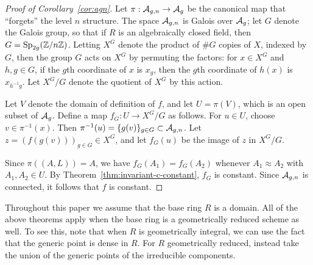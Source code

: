 \documentclass{amsart}
\begin{document}
\begin{proof}[Proof of Corollary~\ref{cor:agn}]
  Let $\pi: \mathcal{A}_{g,n} \to \mathcal{A}_g$ be the canonical map that ``forgets'' the level $n$ structure. The space $\mathcal{A}_{g,n}$ is Galois over $\mathcal{A}_g$; let $G$ denote the Galois group, so that if $R$ is an algebraically closed field, then $G = \operatorname{Sp}_{2g}(\mathbb{Z}/n\mathbb{Z})$. Letting $X^G$ denote the product of $\# G$ copies of $X$, indexed by $G$, then the group $G$ acts on $X^G$ by permuting the factors: for $x \in X^G$ and $h,g \in G$, if the $g$th coordinate of $x$ is $x_g$, then the $g$th coordinate of $h(x)$ is $x_{h^{-1}g}$.
  Let $X^G/G$ denote the quotient of $X^G$ by this action.

  Let $V$ denote the domain of definition of $f$, and let $U = \pi(V)$, which is an open subset of $\mathcal{A}_g$. Define a map $f_G: U \to X^G/G$ as follows. For $u \in U$, choose  $v \in \pi^{-1}(x)$. Then $\pi^{-1}(u) = \{g(v)\}_{g \in G} \subset \mathcal{A}_{g,n}$. Let $z = (f(g(v)))_{g \in G} \in X^G$, and let $f_G(u)$ be the image of $z$ in $X^G/G$.

  Since $\pi((A,L)) = A$, we have $f_G(A_1) = f_G(A_2)$ whenever $A_1 \approx A_2$ with $A_1,A_2 \in U$. By Theorem~\ref{thm:invariant-c-constant}, $f_G$ is constant. Since $\mathcal{A}_{g,n}$ is connected, it follows that $f$ is constant.
\end{proof}

\begin{remark}
Throughout this paper we assume that the base ring $R$ is a domain.
  All of the above theorems apply when the base ring is a geometrically reduced scheme as well. To see this, note that when $R$ is geometrically integral, we can use the fact that the generic point is dense in $R$. For $R$ geometrically reduced, instead take the union of the generic points of the irreducible components.
\end{remark}










\end{document}
